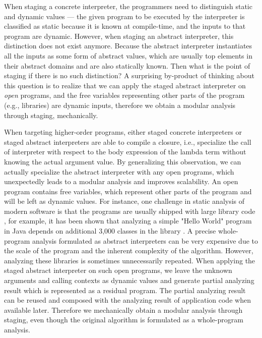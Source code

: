 When staging a concrete interpreter, the programmers need to distinguish static
and dynamic values --- the given program to be executed by the interpreter is
classified as static because it is known at compile-time, and the inputs to that
program are dynamic. However, when staging an abstract interpreter, this
distinction does not exist anymore. Because the abstract interpreter
instantiates all the inputs as some form of abstract values, which are usually
top elements in their abstract domains and are also statically known. Then what
is the point of staging if there is no such distinction? A surprising by-product
of thinking about this question is to realize that we can apply the staged
abstract interpreter on \textit{open} programs, and the free variables
representing other parts of the program (e.g., libraries) are dynamic inputs,
therefore we obtain a modular analysis through staging, mechanically.

When targeting higher-order programs, either staged concrete interpreters or
staged abstract interpreters are able to compile a closure, i.e., specialize the
call of interpreter with respect to the body expression of the lambda term
without knowing the actual argument value. By generalizing this observation, we
can actually specialize the abstract interpreter with any open programs, which
unexpectedly leads to a modular analysis and improves scalability. An open
program contains free variables, which represent other parts of the program and
will be left as dynamic values. For instance, one challenge in static analysis
of modern software is that the programs are usually shipped with large library
code \cite{toman_et_al:LIPIcs:2017:7121}, for example, it has been shown that
analyzing a simple "Hello World" program in Java depends on additional 3,000
classes in the library \cite{DBLP:conf/oopsla/KulkarniMZN16}. A precise
whole-program analysis formulated as abstract interpreters can be very expensive
due to the scale of the program and the inherent complexity of the algorithm.
However, analyzing these libraries is sometimes unnecessarily repeated. When
applying the staged abstract interpreter on such open programs, we leave the
unknown arguments and calling contexts as dynamic values and generate partial
analyzing result which is represented as a residual program. The partial
analyzing result can be reused and composed with the analyzing result of
application code when available later. Therefore we mechanically obtain a
modular analysis through staging, even though the original algorithm is
formulated as a whole-program analysis.

